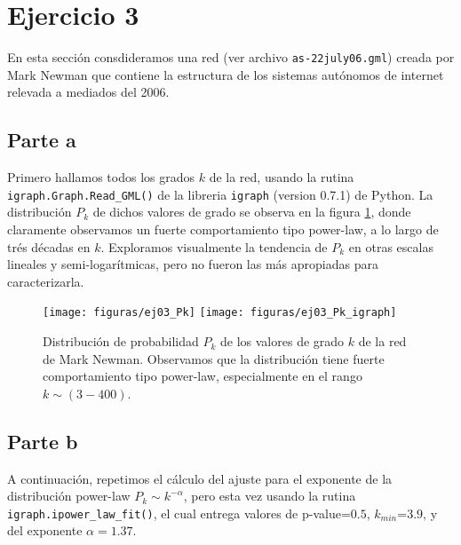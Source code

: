 \section{Ejercicio 3}

En esta secci\'on consdideramos una red (ver archivo \texttt{as-22july06.gml}) creada por Mark Newman que contiene la estructura de los sistemas aut\'onomos de internet relevada a mediados del 2006.


\subsection{Parte a}

Primero hallamos todos los grados $k$ de la red, usando la rutina \texttt{igraph.Graph.Read\_GML()} de la libreria \texttt{igraph} (version 0.7.1) de Python.
La distribuci\'on $P_k$ de dichos valores de grado se observa en la figura \ref{fig:ej03_1}, donde claramente observamos un fuerte comportamiento tipo power-law, a lo largo de tr\'es d\'ecadas en $k$.
Exploramos visualmente la tendencia de $P_k$ en otras escalas lineales y semi-logar\'itmicas, pero no fueron las m\'as apropiadas para caracterizarla.


\begin{figure}
\centering
\texttt{[image: figuras/ej03\_Pk]}
\texttt{[image: figuras/ej03\_Pk\_igraph]}
\caption{Distribuci\'on de probabilidad $P_k$ de los valores de grado $k$ de la red de Mark Newman.
Observamos que la distribuci\'on tiene fuerte comportamiento tipo power-law, especialmente en el rango $k \sim (3-400)$.}
\label{fig:ej03_1}
\end{figure}



\subsection{Parte b}

A continuaci\'on, repetimos el c\'alculo del ajuste para el exponente de la distribuci\'on power-law $P_k \sim k^{-\alpha}$, pero esta vez usando la rutina \texttt{igraph.ipower\_law\_fit()}, el cual entrega valores de p-value=$0.5$, $k_{min}$=$3.9$, y del exponente $\alpha=1.37$.



